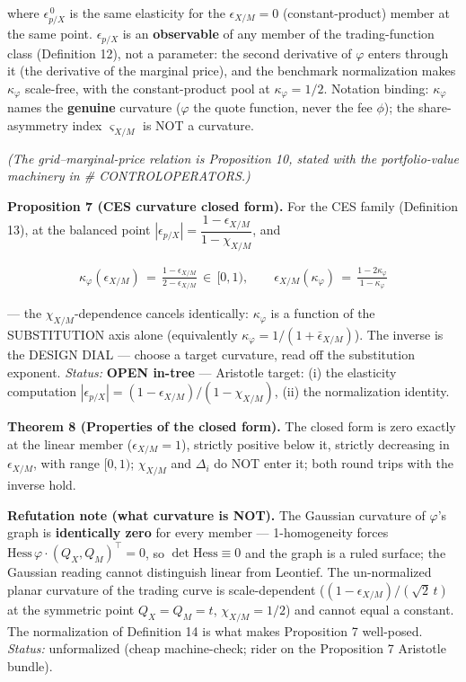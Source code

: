 \documentclass[11pt]{article}
\renewcommand{\_}{\textunderscore\allowbreak}
\begin{document}
where \(\epsilon_{p/X}^{\,0}\) is the same elasticity for the \(\epsilon_{X/M} = 0\) (constant-product) member at the same point. \(\epsilon_{p/X}\) is an \textbf{observable} of any member of the trading-function class (Definition 12), not a parameter: the second derivative of \(\varphi\) enters through it (the derivative of the marginal price), and the benchmark normalization makes \(\kappa_{\varphi}\) scale-free, with the constant-product pool at \(\kappa_{\varphi} = 1/2\). Notation binding: \(\kappa_{\varphi}\) names the \textbf{genuine} curvature (\(\varphi\) the quote function, never the fee \(\phi\)); the share-asymmetry index \(\varsigma_{X/M}\) is NOT a curvature.

\emph{(The grid--marginal-price relation is Proposition 10, stated with the portfolio-value machinery in \# CONTROL\_OPERATORS.)}

\textbf{Proposition 7 (CES curvature closed form).} For the CES family (Definition 13), at the balanced point \(|\epsilon_{p/X}| = \dfrac{1-\epsilon_{X/M}}{1-\chi_{X/M}}\), and

\[
    \begin{aligned}
        \kappa_{\varphi}(\epsilon_{X/M}) \, = \, \frac{1 - \epsilon_{X/M}}{2 - \epsilon_{X/M}} \, \in \, [0,1), \qquad
        \epsilon_{X/M}(\kappa_{\varphi}) \, = \, \frac{1 - 2\kappa_{\varphi}}{1 - \kappa_{\varphi}}
    \end{aligned}
\]

--- the \(\chi_{X/M}\)-dependence cancels identically: \(\kappa_{\varphi}\) is a function of the SUBSTITUTION axis alone (equivalently \(\kappa_{\varphi} = 1/(1+\bar\epsilon_{X/M})\)). The inverse is the DESIGN DIAL --- choose a target curvature, read off the substitution exponent. \emph{Status:} \textbf{OPEN in-tree} --- Aristotle target: (i) the elasticity computation \(|\epsilon_{p/X}| = (1-\epsilon_{X/M})/(1-\chi_{X/M})\), (ii) the normalization identity.

\textbf{Theorem 8 (Properties of the closed form).} The closed form is zero exactly at the linear member (\(\epsilon_{X/M} = 1\)), strictly positive below it, strictly decreasing in \(\epsilon_{X/M}\), with range \([0,1)\); \(\chi_{X/M}\) and \(\Delta_i\) do NOT enter it; both round trips with the inverse hold.

\textbf{Refutation note (what curvature is NOT).} The Gaussian curvature of \(\varphi\)'s graph is \textbf{identically zero} for every member --- 1-homogeneity forces \(\mathrm{Hess}\,\varphi \cdot (Q_X,Q_M)^{\top} = 0\), so \(\det \mathrm{Hess} \equiv 0\) and the graph is a ruled surface; the Gaussian reading cannot distinguish linear from Leontief. The un-normalized planar curvature of the trading curve is scale-dependent (\((1-\epsilon_{X/M})/(\sqrt{2}\,t)\) at the symmetric point \(Q_X = Q_M = t\), \(\chi_{X/M} = 1/2\)) and cannot equal a constant. The normalization of Definition 14 is what makes Proposition 7 well-posed. \emph{Status:} unformalized (cheap machine-check; rider on the Proposition 7 Aristotle bundle).
\end{document}
